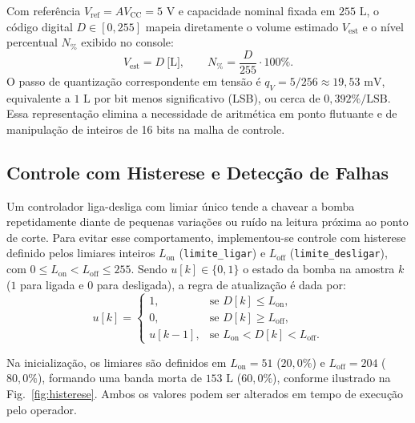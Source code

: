 \documentclass[conference]{IEEEtran}
\begin{document}
Com referência $V_{\text{ref}} = AV_{\text{CC}} = 5\text{ V}$ e capacidade nominal fixada em $255\text{ L}$, o código digital $D \in [0, 255]$ mapeia diretamente o volume estimado $V_{\text{est}}$ e o nível percentual $N_{\%}$ exibido no console:
\begin{equation}
	V_{\text{est}} = D\ \text{[L]}, \qquad N_{\%} = \frac{D}{255}\cdot 100\%.
	\label{eq:nivel}
\end{equation}
O passo de quantização correspondente em tensão é $q_V = 5/256 \approx 19{,}53\text{ mV}$, equivalente a $1\text{ L}$ por bit menos significativo (LSB), ou cerca de $0{,}392\%/\text{LSB}$. Essa representação elimina a necessidade de aritmética em ponto flutuante e de manipulação de inteiros de 16 bits na malha de controle.

\subsection{Controle com Histerese e Detecção de Falhas}
Um controlador liga-desliga com limiar único tende a chavear a bomba repetidamente diante de pequenas variações ou ruído na leitura próxima ao ponto de corte. Para evitar esse comportamento, implementou-se controle com histerese definido pelos limiares inteiros $L_{\text{on}}$ (\texttt{limite\_ligar}) e $L_{\text{off}}$ (\texttt{limite\_desligar}), com $0 \le L_{\text{on}} < L_{\text{off}} \le 255$. Sendo $u[k] \in \{0, 1\}$ o estado da bomba na amostra $k$ ($1$ para ligada e $0$ para desligada), a regra de atualização é dada por:
\begin{equation}
	u[k] =
	\begin{cases}
		1,      & \text{se } D[k] \le L_{\text{on}},                \\
		0,      & \text{se } D[k] \ge L_{\text{off}},               \\
		u[k-1], & \text{se } L_{\text{on}} < D[k] < L_{\text{off}}.
	\end{cases}
	\label{eq:histerese}
\end{equation}

Na inicialização, os limiares são definidos em $L_{\text{on}} = 51$ ($20{,}0\%$) e $L_{\text{off}} = 204$ ($80{,}0\%$), formando uma banda morta de $153\text{ L}$ ($60{,}0\%$), conforme ilustrado na Fig.~\ref{fig:histerese}. Ambos os valores podem ser alterados em tempo de execução pelo operador.
\end{document}
